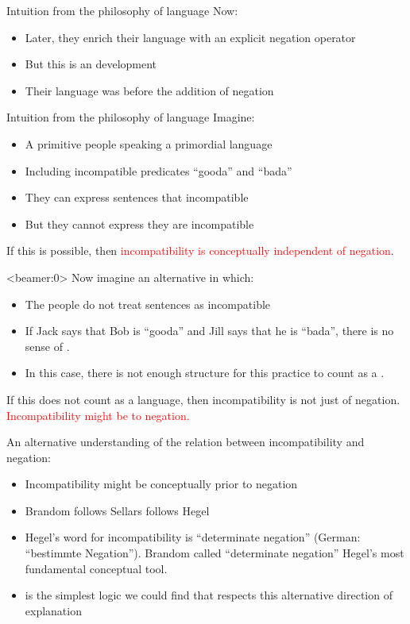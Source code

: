 \begin{frame}{Intuition from the philosophy of language}
Now:
\begin{itemize}
\item
Later, they  enrich their language with an explicit negation operator
\item
But this is an  development
\item
Their language was  before the addition of negation
\end{itemize}

\end{frame}

\begin{frame}{Intuition from the philosophy of language}
Imagine:
\begin{itemize}
\item
A primitive people speaking a primordial language
\item
Including incompatible predicates ``gooda'' and ``bada''
\item
They can express sentences that  incompatible
\item
But they cannot express  they are incompatible
\end{itemize}
If this is possible, then \textcolor{red}{incompatibility is conceptually independent of negation}.
\end{frame} 

\begin{frame}<beamer:0>
Now imagine an alternative in which:
\begin{itemize}
\item
The people do not treat  sentences as incompatible
\item 
If Jack says that Bob is ``gooda'' and Jill says that he is ``bada'', there is no sense of .
\item
In this case, there is not enough structure for this practice to count as a .
\end{itemize}
If this does not count as a language, then incompatibility is not just  of negation.
\textcolor{red}{Incompatibility might be  to negation.}
\end{frame}

\begin{frame}
An alternative understanding of the relation between incompatibility and negation:
\begin{itemize}
\item
Incompatibility might be conceptually prior to negation
\item
Brandom follows Sellars follows Hegel
\item
  Hegel's word for incompatibility is ``determinate negation'' (German: ``bestimmte Negation'').
  Brandom called ``determinate negation'' Hegel's most fundamental conceptual tool. 
\item
\Cathoristic{} is the simplest logic we could find that respects this alternative direction of explanation
\end{itemize}
\end{frame}



